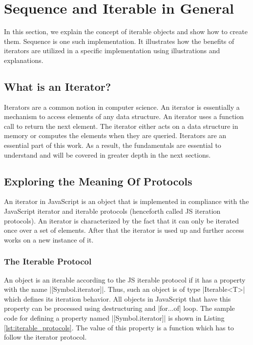\section{Sequence and Iterable in General}
\label{sec:Sequence and Iterable in General}
In this section, we explain the concept of iterable objects and show how to 
create them. Sequence is one such implementation. It illustrates how the 
benefits of iterators are utilized in a specific implementation using 
illustrations and explanations.

\subsection{What is an Iterator?}
\label{sub:What is an Iterator?}
Iterators are a common notion in computer science. An iterator is essentially 
a mechanism to access elements of any data structure. An iterator uses a 
function call to return the next element. The iterator either acts on a data 
structure in memory or computes the elements when they are queried. Iterators 
are an essential part of this work. As a result, the fundamentals are essential 
to understand and will be covered in greater depth in the next sections.

\subsection{Exploring the Meaning Of Protocols}
\label{sub:Exploring the Meaning Of Protocols}
An iterator in JavaScript is an object that is implemented in compliance with
the JavaScript iterator and iterable protocols %
(henceforth called JS iteration protocols). An iterator is characterized by the
fact that it can only be iterated once over a set of elements. After that the
iterator is used up and further access works on a new instance of it.


\subsubsection{The Iterable Protocol}
\label{subsub:The Iterable Protocol}
An object is an iterable according to the JS iterable protocol if it has a
property with the name |[Symbol.iterator]|. Thus, such an object is of type
|Iterable<T>| which defines its iteration behavior. All objects in JavaScript
that have this property can be processed using destructuring and |for...of|
loop. The sample code for defining a property named |[Symbol.iterator]| is shown
in Listing \ref{lst:iterable_protocols}. The value of this property is a
function which has to follow the iterator protocol.

